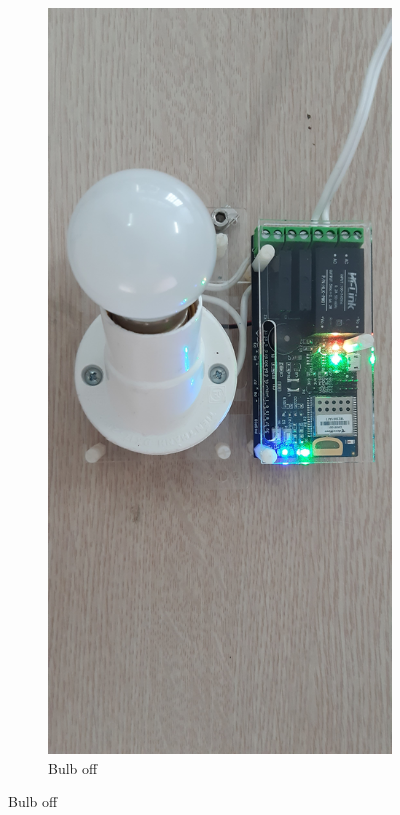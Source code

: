\documentclass[\main/main.tex]{subfiles}
\begin{document}
\begin{figure}[H]
    \centering
    \begin{subfigure}[b]{0.4\linewidth}
        \centering
        \includegraphics[angle = 90, width=0.9\linewidth]{result_remote_control_off_result.jpg}
        \caption{Bulb off}
        \label{fig:result_remote_control_off_result}

\end{subfigure}
\end{figure}
\end{document}
